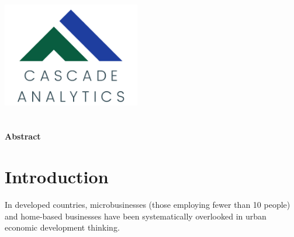 \documentclass[
a4paper, %
12pt, %
]{CascadeAnalyticsWPS}
\begin{document}
	
	
	\thispagestyle{empty} %
	\begin{titlepage}
		\centering
		\includegraphics[width =6cm]{company.png}\\ \vspace{5mm}	
		{\LARGE\sffamily\mdseries\reporttitle} \\ %
		\vspace{5mm}	
		{\normalsize{\reportauthors}} \\ %
		\vspace{5mm}
		{\textbf{\normalsize{Abstract}}}\\
		\vspace{3mm}
		{} 
		\vfill\vfill\vfill %
		{\large\reportdate\par} %
	\end{titlepage}	
	\newpage
	
	\tableofcontents
	\protect\thispagestyle{empty}
	\cleardoublepage
	
	\newpage

\section{Introduction}
	
In developed countries, microbusinesses (those employing fewer than 10 people) and home-based businesses have been systematically overlooked in urban economic development thinking. 
\end{document}
